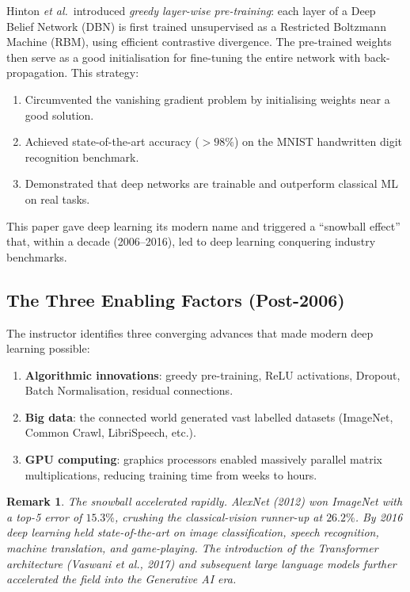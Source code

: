 \documentclass[12pt,a4paper]{article}
\newtheorem{remark}{Remark}[section]
\begin{document}
\begin{keyinsight}[title=The 2006 Breakthrough]
Hinton \emph{et al.}\ introduced \emph{greedy layer-wise pre-training}:
each layer of a Deep Belief Network (DBN) is first trained unsupervised as a
Restricted Boltzmann Machine (RBM), using efficient contrastive divergence.
The pre-trained weights then serve as a good initialisation for fine-tuning
the entire network with back-propagation.  This strategy:
\begin{enumerate}
  \item Circumvented the vanishing gradient problem by initialising weights
        near a good solution.
  \item Achieved state-of-the-art accuracy ($>98\%$) on the MNIST handwritten
        digit recognition benchmark.
  \item Demonstrated that deep networks are trainable and outperform
        classical ML on real tasks.
\end{enumerate}
This paper gave deep learning its modern name and triggered a ``snowball
effect'' that, within a decade (2006--2016), led to deep learning conquering
industry benchmarks.
\end{keyinsight}

\subsection{The Three Enabling Factors (Post-2006)}
\label{subsec:enablers}

The instructor identifies three converging advances that made modern deep
learning possible:

\begin{enumerate}[label=\textbf{E\arabic*.}]
  \item \textbf{Algorithmic innovations}: greedy pre-training, ReLU
        activations, Dropout, Batch Normalisation, residual connections.
  \item \textbf{Big data}: the connected world generated vast labelled
        datasets (ImageNet, Common Crawl, LibriSpeech, etc.).
  \item \textbf{GPU computing}: graphics processors enabled massively parallel
        matrix multiplications, reducing training time from weeks to hours.
\end{enumerate}

\begin{remark}
\label{rem:timeline}
The snowball accelerated rapidly.  AlexNet (2012) won ImageNet with a
top-5 error of $15.3\%$, crushing the classical-vision runner-up at $26.2\%$.
By 2016 deep learning held state-of-the-art on image classification, speech
recognition, machine translation, and game-playing.  The introduction of the
Transformer architecture (Vaswani \emph{et al.}, 2017) and subsequent
large language models further accelerated the field into the Generative AI era.
\end{remark}
\end{document}
